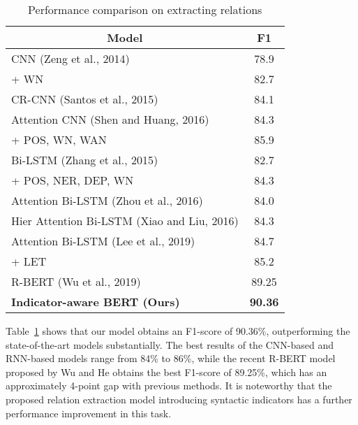\documentclass[conference]{IEEEtran}
\begin{document}
\begin{table}[ht]
\renewcommand\arraystretch{1.5}
\caption{Performance comparison on extracting relations}
\begin{center}
\begin{tabular}{|l|c|}
\hline
\multicolumn{1}{|c|}{\textbf{Model}}    & \multicolumn{1}{|c|}{\textbf{F1}}    \\ \hline
 CNN (Zeng et al., 2014) \cite{zeng2014relation}                             & 78.9           \\
                                                             + WN                     & 82.7           \\ \hline 
CR-CNN (Santos et al., 2015)\cite{dos2015classifying}                                     & 84.1           \\ \hline 
 Attention CNN (Shen and Huang, 2016) \cite{huang2016attention}                     & 84.3       \\
                                            + POS, WN, WAN                             & 85.9           \\ \hline
 Bi-LSTM (Zhang et al., 2015) \cite{zhang2015relation}                                       & 82.7           \\
                                                  + POS, NER, DEP, WN            & 84.3           \\ \hline
 Attention Bi-LSTM (Zhou et al., 2016) \cite{zhou2016attention}                         & 84.0           \\ \hline
Hier Attention Bi-LSTM (Xiao and Liu, 2016) \cite{xiao2016semantic}                       & 84.3           \\ \hline 
Attention Bi-LSTM (Lee et al., 2019) \cite{lee2019semantic}                     & 84.7           \\
                                + LET                                      & 85.2           \\ \hline
 R-BERT (Wu et al., 2019) \cite{wu2019enriching}                                              & 89.25          \\ \hline 
 \textbf{Indicator-aware BERT (Ours)}                                   & \textbf{90.36} \\ \hline
\end{tabular}
\label{table:table1}
\end{center}
\end{table}

Table~\ref{table:table1} shows that our model obtains an F1-score of 90.36\%, outperforming the state-of-the-art models substantially. The best results of the CNN-based and RNN-based models range from 84\% to 86\%, while the recent R-BERT model proposed by Wu and He \cite{wu2019enriching} obtains the best F1-score of 89.25\%, which has an approximately 4-point gap with previous methods. It is noteworthy that the proposed relation extraction model introducing syntactic indicators has a further performance improvement in this task.
\end{document}
